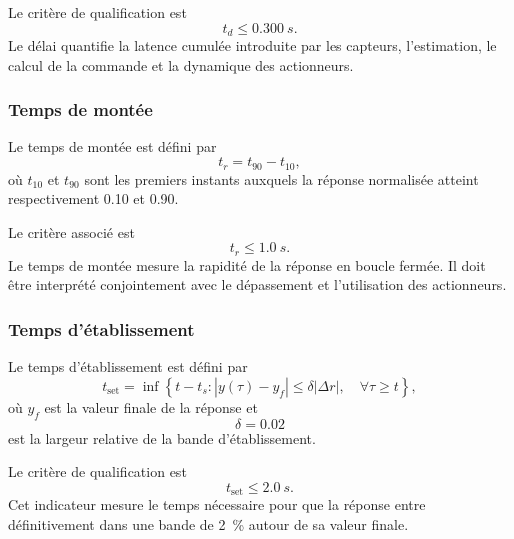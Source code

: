 \documentclass[11pt,a4paper,oneside]{report}
\begin{document}
Le critère de qualification est
\begin{equation}
	t_d\leq\SI{0.300}{s}.
	\label{eq_delay_requirement}
\end{equation}
Le délai quantifie la latence cumulée introduite par les capteurs, l'estimation, le calcul de la commande et la dynamique des actionneurs.

\subsubsection{Temps de montée}

Le temps de montée est défini par
\begin{equation}
	t_r=t_{90}-t_{10},
	\label{eq_qualification_rise_time}
\end{equation}
où $t_{10}$ et $t_{90}$ sont les premiers instants auxquels la réponse normalisée atteint respectivement \num{0.10} et \num{0.90}.

Le critère associé est
\begin{equation}
	t_r\leq\SI{1.0}{s}.
	\label{eq_rise_time_requirement}
\end{equation}
Le temps de montée mesure la rapidité de la réponse en boucle fermée. Il doit être interprété conjointement avec le dépassement et l'utilisation des actionneurs.

\subsubsection{Temps d'établissement}

Le temps d'établissement est défini par
\begin{equation}
	t_{\mathrm{set}}
	=
	\inf
	\left\{
	t-t_s:
	|y(\tau)-y_f|
	\leq
	\delta|\Delta r|,
	\quad
	\forall \tau\geq t
	\right\},
	\label{eq_qualification_settling_time}
\end{equation}
où $y_f$ est la valeur finale de la réponse et
\begin{equation}
	\delta=0.02
	\label{eq_settling_band}
\end{equation}
est la largeur relative de la bande d'établissement.

Le critère de qualification est
\begin{equation}
	t_{\mathrm{set}}
	\leq
	\SI{2.0}{s}.
	\label{eq_settling_time_requirement}
\end{equation}
Cet indicateur mesure le temps nécessaire pour que la réponse entre définitivement dans une bande de \SI{2}{\percent} autour de sa valeur finale.
\end{document}
